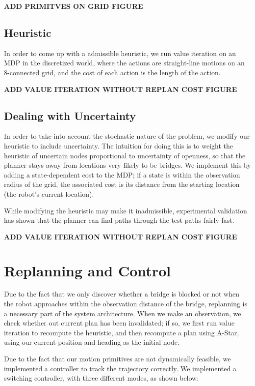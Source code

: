 \documentclass{article}
\begin{document}
\textbf{ADD PRIMITVES ON GRID FIGURE}

\subsection{Heuristic}

In order to come up with a admissible heuristic, we run value iteration on an MDP in the discretized world, where the actions are straight-line motions on an 8-connected grid, and the cost of each action is the length of the action. 

\textbf{ADD VALUE ITERATION WITHOUT REPLAN COST FIGURE}

\subsection{Dealing with Uncertainty}

In order to take into account the stochastic nature of the problem, we modify our heuristic to include uncertainty. The intuition for doing this is to weight the heuristic of uncertain nodes proportional to uncertainty of openness, so that the planner stays away from locations very likely to be bridges. We implement this by adding a state-dependent cost to the MDP; if a state is within the observation radius of the grid, the associated cost is its distance from the starting location (the robot's current location).

While modifying the heuristic may make it inadmissible, experimental validation has shown that the planner can find paths through the test paths fairly fast.

\textbf{ADD VALUE ITERATION WITHOUT REPLAN COST FIGURE}

\section{Replanning and Control}

Due to the fact that we only discover whether a bridge is blocked or not when the robot approaches within the observation distance of the bridge, replanning is a necessary part of the system architecture. When we make an observation, we check whether out current plan has been invalidated; if so, we first run value iteration to recompute the heuristic, and then recompute a plan using A-Star, using our current position and heading as the initial node.

Due to the fact that our motion primitives are not dynamically feasible, we implemented a controller to track the trajectory correctly. We implemented a switching controller, with three different modes, as shown below:
\end{document}

